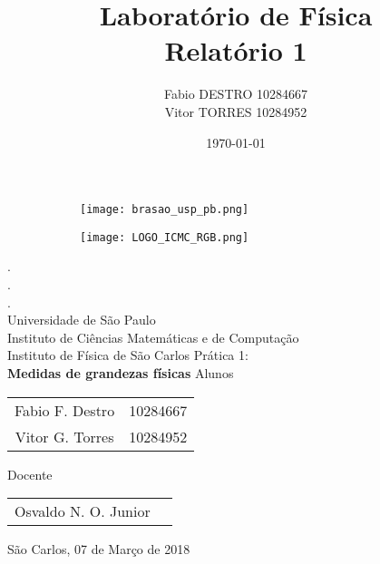 \documentclass{article}
\title{
{\huge Laboratório de Física}\\{\Large Relatório 1}}
\author{Fabio DESTRO 10284667\\Vitor TORRES 10284952\\}
\date{\today}
\begin{document}
\begin{figure}[t]
    \begin{subfigure}{0.49\textwidth}
        \centering
        \texttt{[image: brasao\_usp\_pb.png]}
    \end{subfigure}
    \hfill
    \begin{subfigure}{0.49\textwidth}
       \centering
        \texttt{[image: LOGO\_ICMC\_RGB.png]}
    \end{subfigure}
\end{figure}

\begin{titlepage}
\centering
{\Large
{\color{white}.\\.\\.} \\
Universidade de São Paulo\\
Instituto de Ciências Matemáticas e de Computação\\\vspace{1.8mm}
Instituto de Física de São Carlos}
\vfill
Prática 1:\\
{\Large\textbf{
Medidas de grandezas físicas}}
\vfill
Alunos
\begin{tabular}{c c}
    Fabio F. Destro & 10284667\\
    Vitor G. Torres & 10284952
\end{tabular}
\vfill
Docente
\begin{tabular}{c c}
    Osvaldo N. O. Junior
\end{tabular}
\vfill
São Carlos, 07 de Março de 2018\\
\end{titlepage}
\end{document}
